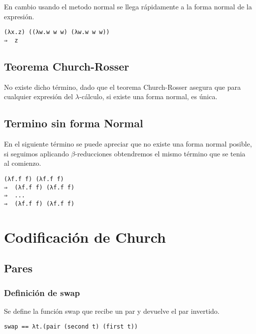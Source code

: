 \documentclass[11pt, spanish]{scrartcl}
\numberwithin{equation}{section} %
\numberwithin{figure}{section} %
\numberwithin{table}{section} %
\begin{document}
En cambio usando el metodo normal se llega rápidamente a la forma normal de la expresión.

\begin{lstlisting}[language=Lambda]
(λx.z) ((λw.w w w) (λw.w w w))
⇒  z
\end{lstlisting}


\subsection{Teorema Church-Rosser}

No existe dicho término, dado que el teorema Church-Rosser asegura que para cualquier 
expresión del \( \lambda \)-cálculo, si existe una forma normal, es única.

\subsection{Termino sin forma Normal}

En el siguiente término se puede apreciar que no existe una forma normal posible, si seguimos aplicando \( \beta \)-reducciones
obtendremos el mismo término que se tenia al comienzo.

\begin{lstlisting}[language=Lambda]
(λf.f f) (λf.f f)
⇒  (λf.f f) (λf.f f)
⇒  ...   
⇒  (λf.f f) (λf.f f)
\end{lstlisting}

\newpage

\section{Codificación de Church}

\subsection{Pares}

\subsubsection{Definición de swap}

Se define la función swap que recibe un par y devuelve el par invertido.

\begin{lstlisting}[language=Lambda]
swap == λt.(pair (second t) (first t))
\end{lstlisting}
\end{document}

